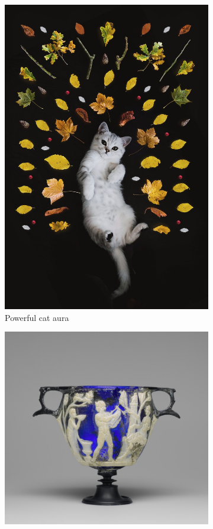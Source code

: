 \documentclass{article}
\begin{document}
\begin{figure}
\begin{subfigure}[b]{0.2\linewidth}
			\includegraphics[width=\linewidth]{images/wtf.jpeg}
			\caption{Powerful cat aura}
		\end{subfigure}
		\begin{subfigure}[b]{0.2\linewidth}
			\includegraphics[width=\linewidth]{images/vase.jpg}

\end{subfigure}
\end{figure}
\end{document}
